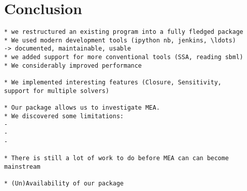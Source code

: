 \section{Conclusion} \label{sec:conclus}
\begin{verbatim}
* we restructured an existing program into a fully fledged package
* We used modern development tools (ipython nb, jenkins, \ldots)
-> documented, maintainable, usable
* we added support for more conventional tools (SSA, reading sbml)
* We considerably improved performance

* We implemented interesting features (Closure, Sensitivity,
support for multiple solvers)

* Our package allows us to investigate MEA.
* We discovered some limitations:
-
-
-

* There is still a lot of work to do before MEA can can become mainstream

* (Un)Availability of our package

\end{verbatim}